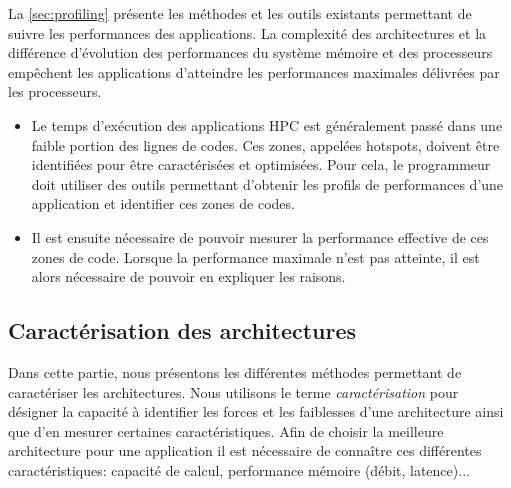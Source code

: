     La \autoref{sec:profiling} présente les méthodes et les outils existants permettant de suivre les performances des applications. La complexité des architectures et la différence d'évolution des performances du système mémoire et des processeurs empêchent les applications d'atteindre les performances maximales délivrées par les processeurs. 
    \begin{itemize}
        \item Le temps d'exécution des applications HPC est généralement passé dans une faible portion des lignes de codes. Ces zones, appelées \glspl{hotspot}, doivent être identifiées pour être caractérisées et optimisées. Pour cela, le programmeur doit utiliser des outils permettant d'obtenir les profils de performances d'une application et identifier ces zones de codes.
        
        \item Il est ensuite nécessaire de pouvoir mesurer la performance effective de ces zones de code. Lorsque la performance maximale n'est pas atteinte, il est alors nécessaire de pouvoir en expliquer les raisons. 
    \end{itemize}
    
      
\subsection{Caractérisation des architectures}\label{sec:caracterisation}
    
    Dans cette partie, nous présentons les différentes méthodes permettant de caractériser les architectures. Nous utilisons le terme \textit{caractérisation} pour désigner la capacité à identifier les forces et les faiblesses d'une architecture ainsi que d'en mesurer certaines caractéristiques. Afin de choisir la meilleure architecture pour une application il est nécessaire de connaître ces différentes caractéristiques: capacité de calcul, performance mémoire (débit, latence)...
    
